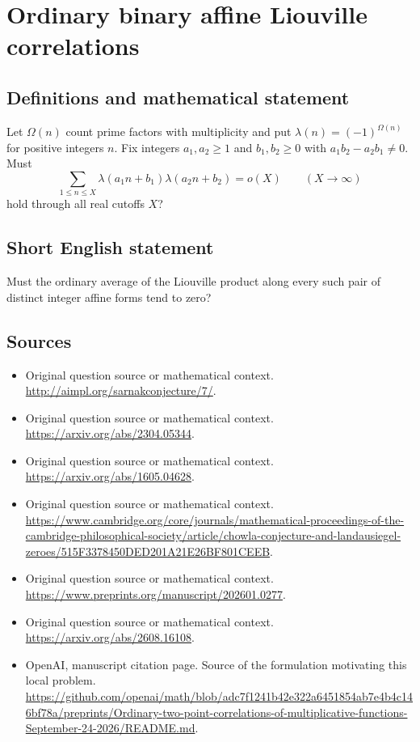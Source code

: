 \documentclass[11pt]{article}
\begin{document}
\section*{Ordinary binary affine Liouville correlations}\label{statement}
\subsection{Definitions and mathematical statement}
Let $\Omega(n)$ count prime factors with multiplicity and put $\lambda(n)=(-1)^{\Omega(n)}$ for positive integers $n$. Fix integers $a_1,a_2\ge1$ and $b_1,b_2\ge0$ with $a_1b_2-a_2b_1\ne0$. Must
\[
 \sum_{1\le n\le X}\lambda(a_1n+b_1)\lambda(a_2n+b_2)=o(X)
 \qquad(X\to\infty)
\]
hold through all real cutoffs $X$?
\subsection{Short English statement}
Must the ordinary average of the Liouville product along every such pair of distinct integer affine forms tend to zero?
\subsection{Sources}
\begin{itemize}
\item[S1] Original question source or mathematical context.
\url{http://aimpl.org/sarnakconjecture/7/}.
\item[S2] Original question source or mathematical context.
\url{https://arxiv.org/abs/2304.05344}.
\item[S3] Original question source or mathematical context.
\url{https://arxiv.org/abs/1605.04628}.
\item[S4] Original question source or mathematical context.
\url{https://www.cambridge.org/core/journals/mathematical-proceedings-of-the-cambridge-philosophical-society/article/chowla-conjecture-and-landausiegel-zeroes/515F3378450DED201A21E26BF801CEEB}.
\item[S5] Original question source or mathematical context.
\url{https://www.preprints.org/manuscript/202601.0277}.
\item[S6] Original question source or mathematical context.
\url{https://arxiv.org/abs/2608.16108}.
\item[S7] OpenAI, manuscript citation page. Source of the formulation motivating this local problem.
\url{https://github.com/openai/math/blob/adc7f1241b42e322a6451854ab7e4b4c146bf78a/preprints/Ordinary-two-point-correlations-of-multiplicative-functions-September-24-2026/README.md}.
\end{itemize}
\end{document}
